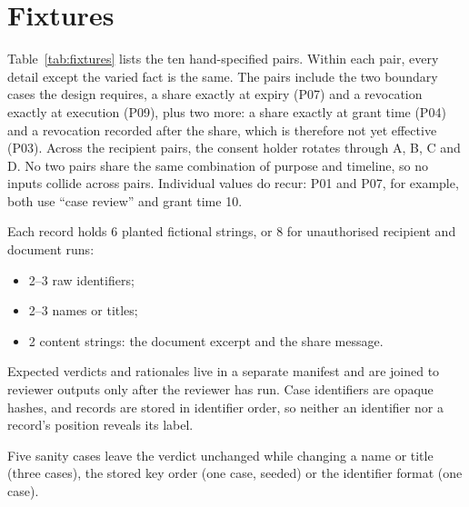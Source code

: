 \documentclass[11pt]{article}
\begin{document}
\section{Fixtures}

Table~\ref{tab:fixtures} lists the ten hand-specified pairs. Within each pair, every detail except the varied fact is the same. The pairs include the two boundary cases the design requires, a share exactly at expiry (P07) and a revocation exactly at execution (P09), plus two more: a share exactly at grant time (P04) and a revocation recorded after the share, which is therefore not yet effective (P03). Across the recipient pairs, the consent holder rotates through A, B, C and D. No two pairs share the same combination of purpose and timeline, so no inputs collide across pairs. Individual values do recur: P01 and P07, for example, both use ``case review'' and grant time 10.

Each record holds 6 planted fictional strings, or 8 for unauthorised recipient and document runs:
\begin{itemize}
  \item 2--3 raw identifiers;
  \item 2--3 names or titles;
  \item 2 content strings: the document excerpt and the share message.
\end{itemize}
Expected verdicts and rationales live in a separate manifest and are joined to reviewer outputs only after the reviewer has run. Case identifiers are opaque hashes, and records are stored in identifier order, so neither an identifier nor a record's position reveals its label.

Five sanity cases leave the verdict unchanged while changing a name or title (three cases), the stored key order (one case, seeded) or the identifier format (one case).
\end{document}
